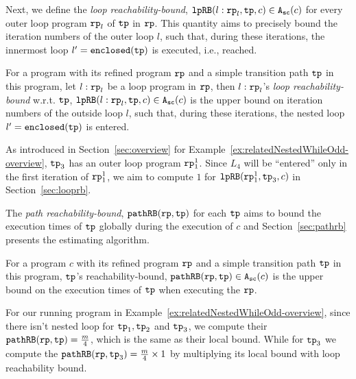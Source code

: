 Next, we define the \emph{loop reachability-bound},
$\mathtt{lpRB}(l: \mathtt{rp}_l, \mathtt{tp}, c) \in {\ensuremath{\mathtt{A_{sc}}}}(c)$ for every outer loop program $\mathtt{rp}_l$ of $\mathtt{tp}$ in $\mathtt{rp}$. This quantity aims to precisely bound the iteration numbers of the outer loop $l$,
such that,
during these iterations, the innermost loop $l' = \mathtt{enclosed(\mathtt{tp})}$ is executed, i.e., reached.
\begin{defn}
For a program with its refined program $\mathtt{rp}$ and a simple transition path $\mathtt{tp}$ in this program, 
let $l: \mathtt{rp}_l$ be a loop program in $\mathtt{rp}$,
then $l: \mathtt{rp}_l$'s \emph{loop reachability-bound} w.r.t. $\mathtt{tp}$,  $\mathtt{lpRB}(l: \mathtt{rp}_l, \mathtt{tp}, c) \in {\ensuremath{\mathtt{A_{sc}}}}(c)$
is the upper bound on iteration numbers of the outside loop $l$,
such that,
during these iterations, the nested loop $l' = \mathtt{enclosed(\mathtt{tp})}$ is entered.
\end{defn}
As introduced in Section~\ref{sec:overview} for Example~\ref{ex:relatedNestedWhileOdd-overview}, $\mathtt{tp}_3$ has an outer loop program $\mathtt{rp}_1^1$. Since $L_4$ will be ``entered'' only in the first iteration of $\mathtt{rp}_1^1$,
we aim to compute $1$ for $\mathtt{lpRB}(\mathtt{rp}_1^1, \mathtt{tp}_3, c)$ in Section~\ref{sec:looprb}.

The \emph{path reachability-bound}, $\mathtt{pathRB}(\mathtt{rp}, \mathtt{tp})$ for each $\mathtt{tp}$
aims to bound the execution times of $\mathtt{tp}$ globally during the execution of $c$ and Section~\ref{sec:pathrb} presents the estimating algorithm.
%
\begin{defn}
For a program $c$ with its refined program $\mathtt{rp}$ and a simple transition path $\mathtt{tp}$ in this program, 
$\mathtt{tp}$'s reachability-bound, $\mathtt{pathRB}(\mathtt{rp}, \mathtt{tp}) \in {\ensuremath{\mathtt{A_{sc}}}}(c)$ is the upper bound on the
execution times of $\mathtt{tp}$ when executing the $\mathtt{rp}$.
\end{defn}

For our running program in Example~\ref{ex:relatedNestedWhileOdd-overview}, since there isn't nested loop for $\mathtt{tp}_1, \mathtt{tp}_2$ and $\mathtt{tp}_3$, we compute their $\mathtt{pathRB}(\mathtt{rp}, \mathtt{tp}) = \frac{m}{4} $, which is the same as their local bound.
While for $\mathtt{tp}_3$ we compute  the $\mathtt{pathRB}(\mathtt{rp}, \mathtt{tp}_3) = \frac{m}{4} \times 1$ by multiplying its local bound with loop reachability bound.

